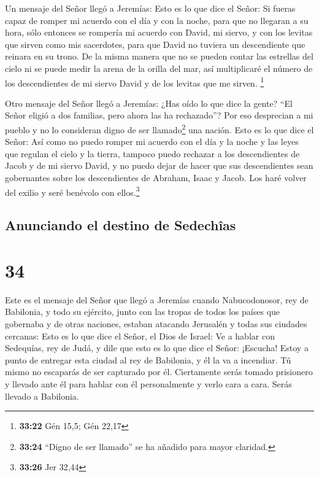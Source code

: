  Un mensaje del Señor llegó a Jeremías: 
Esto es lo que dice el Señor: Si fueras capaz de romper mi acuerdo con
el día y con la noche, para que no llegaran a su hora, 
sólo entonces se rompería mi acuerdo con David, mi siervo, y con los
levitas que sirven como mis sacerdotes, para que David no tuviera un
descendiente que reinara en su trono.  De la misma manera
que no se pueden contar las estrellas del cielo ni se puede medir la
arena de la orilla del mar, así multiplicaré el número de los
descendientes de mi siervo David y de los levitas que me sirven.
\footnote{\textbf{33:22} Gén 15,5; Gén 22,17}

 Otro mensaje del Señor llegó a Jeremías: 
¿Has oído lo que dice la gente? ``El Señor eligió a dos familias, pero
ahora las ha rechazado''? Por eso desprecian a mi pueblo y no lo
consideran digno de ser llamado\footnote{\textbf{33:24} ``Digno de ser
  llamado'' se ha añadido para mayor claridad.} una nación.
 Esto es lo que dice el Señor: Así como no puedo romper
mi acuerdo con el día y la noche y las leyes que regulan el cielo y la
tierra,  tampoco puedo rechazar a los descendientes de
Jacob y de mi siervo David, y no puedo dejar de hacer que sus
descendientes sean gobernantes sobre los descendientes de Abraham, Isaac
y Jacob. Los haré volver del exilio y seré benévolo con
ellos.\footnote{\textbf{33:26} Jer 32,44}

\hypertarget{anunciando-el-destino-de-sedechuxeeas}{%
\subsection{Anunciando el destino de
Sedechîas}\label{anunciando-el-destino-de-sedechuxeeas}}

\hypertarget{section-33}{%
\section{34}\label{section-33}}

 Este es el mensaje del Señor que llegó a Jeremías cuando
Nabucodonosor, rey de Babilonia, y todo su ejército, junto con las
tropas de todos los países que gobernaba y de otras naciones, estaban
atacando Jerusalén y todas sus ciudades cercanas:  Esto es
lo que dice el Señor, el Dios de Israel: Ve a hablar con Sedequías, rey
de Judá, y dile que esto es lo que dice el Señor: ¡Escucha! Estoy a
punto de entregar esta ciudad al rey de Babilonia, y él la va a
incendiar.  Tú mismo no escaparás de ser capturado por él.
Ciertamente serás tomado prisionero y llevado ante él para hablar con él
personalmente y verlo cara a cara. Serás llevado a Babilonia.

